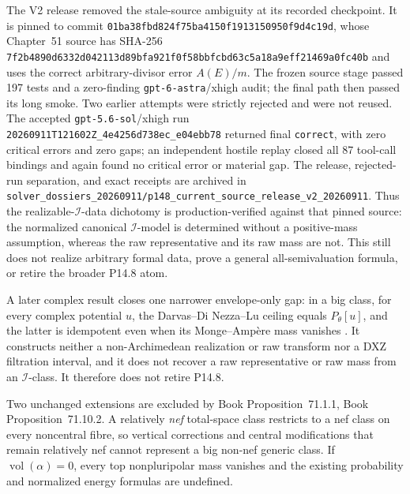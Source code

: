\documentclass[11pt,a4paper]{article}
\theoremstyle{definition}
\theoremstyle{remark}
\begin{document}
The V2 release removed the stale-source ambiguity at its recorded
checkpoint.  It is pinned to commit
\nolinkurl{01ba38fbd824f75ba4150f1913150950f9d4c19d}, whose Chapter~51
source has SHA-256
\nolinkurl{7f2b4890d6332d042113d89bfa921f0f58bbfcbd63c5a18a9eff21469a0fc40b}
and uses the correct arbitrary-divisor error \(A(E)/m\).  The frozen source
stage passed 197 tests and a zero-finding \texttt{gpt-6-astra}/xhigh audit;
the final path then passed its long smoke.  Two earlier attempts were
strictly rejected and were not reused.  The accepted
\texttt{gpt-5.6-sol}/xhigh run
\nolinkurl{20260911T121602Z_4e4256d738ec_e04ebb78} returned final
\texttt{correct}, with zero critical errors and zero gaps; an independent
hostile replay closed all 87 tool-call bindings and again found no critical
error or material gap.  The release, rejected-run separation, and exact
receipts are archived in
\nolinkurl{solver_dossiers_20260911/p148_current_source_release_v2_20260911}.
Thus the realizable-\(\mathcal I\)-data dichotomy is production-verified
against that pinned source: the normalized canonical \(\mathcal I\)-model is
determined without a positive-mass assumption, whereas the raw representative
and its raw mass are not.  This still does not realize arbitrary formal data,
prove a general all-semivaluation formula, or retire the broader P14.8 atom.

A later complex result closes one narrower envelope-only gap: in a big
class, for every complex potential \(u\), the Darvas--Di Nezza--Lu ceiling
equals \(P_\theta[u]\), and the latter is idempotent even when its
Monge--Amp\`ere mass vanishes \cite[Theorem~1.2]{PSWZ26}.  It constructs
neither a non-Archimedean realization or raw transform nor a DXZ
filtration interval, and it does not recover a raw representative or raw
mass from an \(\mathcal I\)-class.  It therefore does not retire P14.8.

Two unchanged extensions are excluded by
Book Proposition~71.1.1, Book Proposition~71.10.2.
A relatively \emph{nef} total-space class restricts to a nef class on every
noncentral fibre, so vertical corrections and central modifications that
remain relatively nef cannot represent a big non-nef generic class.  If
\(\operatorname{vol}(\alpha)=0\), every top nonpluripolar mass vanishes and
the existing probability and normalized energy formulas are undefined.
\end{document}
